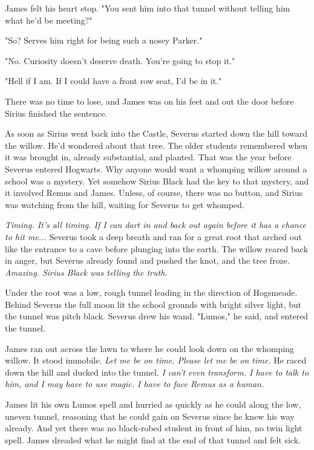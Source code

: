 James felt his heart stop. "You sent him into that tunnel without telling him what he'd be meeting?"

"So? Serves him right for being such a nosey Parker."

"No. Curiosity doesn't deserve death. You're going to stop it."

"Hell if I am. If I could have a front row seat, I'd be in it."

There was no time to lose, and James was on his feet and out the door before Sirius finished the sentence.

As soon as Sirius went back into the Castle, Severus started down the hill toward the willow. He'd wondered about that tree. The older students remembered when it was brought in, already substantial, and planted. That was the year before Severus entered Hogwarts. Why anyone would want a whomping willow around a school was a mystery. Yet somehow Sirius Black had the key to that mystery, and it involved Remus and James. Unless, of course, there was no button, and Sirius was watching from the hill, waiting for Severus to get whomped.

\emph{Timing. It's all timing. If I can dart in and back out again before it has a chance to hit me...} Severus took a deep breath and ran for a great root that arched out like the entrance to a cave before plunging into the earth. The willow reared back in anger, but Severus already found and pushed the knot, and the tree froze. \emph{Amazing. Sirius Black was telling the truth.}

Under the root was a low, rough tunnel leading in the direction of Hogsmeade. Behind Severus the full moon lit the school grounds with bright silver light, but the tunnel was pitch black. Severus drew his wand. "Lumos," he said, and entered the tunnel.

James ran out across the lawn to where he could look down on the whomping willow. It stood immobile. \emph{Let me be on time. Please let me be on time.} He raced down the hill and ducked into the tunnel. \emph{I can't even transform. I have to talk to him, and I may have to use magic. I have to face Remus as a human.}

James lit his own Lumos spell and hurried as quickly as he could along the low, uneven tunnel, reasoning that he could gain on Severus since he knew his way already. And yet there was no black-robed student in front of him, no twin light spell. James dreaded what he might find at the end of that tunnel and felt sick.

